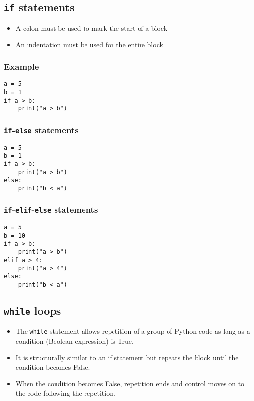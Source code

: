 \documentclass[11pt]{article}
\begin{document}
 \newpage
\subsection{\texttt{if} statements}
\label{sec:orgfc59dfd}
\begin{itemize}
\item A colon must be used to mark the start of a block
\item An indentation must be used for the entire block
\end{itemize}
\subsubsection{Example}
\label{sec:org8dfec8e}
\begin{verbatim}
a = 5
b = 1
if a > b:
    print("a > b")
\end{verbatim}
\subsubsection{\texttt{if}-\texttt{else} statements}
\label{sec:orgd85590e}
\begin{verbatim}
a = 5
b = 1
if a > b:
    print("a > b")
else:
    print("b < a")
\end{verbatim}
\subsubsection{\texttt{if}-\texttt{elif}-\texttt{else} statements}
\label{sec:org74a575c}
\begin{verbatim}
a = 5
b = 10
if a > b:
    print("a > b")
elif a > 4:
    print("a > 4")
else:
    print("b < a")
\end{verbatim}

 \newpage
\subsection{\texttt{while} loops}
\label{sec:org895e15f}
\begin{itemize}
\item The \texttt{while} statement allows repetition of a group of Python code as long as a condition (Boolean expression) is True.
\item It is structurally similar to an if statement but repeats the block until the condition becomes False.
\item When the condition becomes False, repetition ends and control moves on to the code following the repetition.
\end{itemize}
\end{document}
